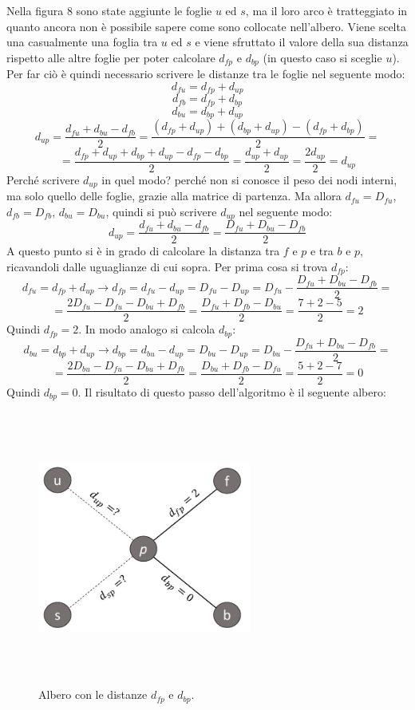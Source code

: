 \newline
Nella figura 8 sono state aggiunte le foglie $u$ ed $s$, ma il loro arco è tratteggiato in quanto ancora non è possibile sapere come sono collocate nell'albero.
\newline
Viene scelta una casualmente una foglia tra $u$ ed $s$ e viene sfruttato il valore della sua distanza rispetto alle altre foglie per poter calcolare $d_{fp}$ e $d_{bp}$ (in questo caso si sceglie $u$). Per far ciò è quindi necessario scrivere le distanze tra le foglie nel seguente modo:
\[d_{fu}=d_{fp}+d_{up}\]
\[d_{fb}=d_{fp}+d_{bp}\]
\[d_{bu}=d_{bp}+d_{up}\]
\[d_{up}=\frac{d_{fu}+d_{bu}-d_{fb}}2=
\frac{(d_{fp}+d_{up})+(d_{bp}+d_{up})-(d_{fp}+d_{bp})}2=\]
\[=\frac{d_{fp}+d_{up}+d_{bp}+d_{up}-d_{fp}-d_{bp}}2=
\frac{d_{up}+d_{up}}2=
\frac{2d_{up}}2=d_{up}
\]
Perché scrivere $d_{up}$ in quel modo? perché non si conosce il peso dei nodi interni, ma solo quello delle foglie, grazie alla matrice di partenza. Ma allora $d_{fu}=D_{fu}$, $d_{fb}=D_{fb}$, $d_{bu}=D_{bu}$, quindi si può scrivere $d_{up}$ nel seguente modo:
\[d_{up}=\frac{d_{fu}+d_{bu}-d_{fb}}2=\frac{D_{fu}+D_{bu}-D_{fb}}2\]
A questo punto si è in grado di calcolare la distanza tra $f$ e $p$ e tra $b$ e $p$, ricavandoli dalle uguaglianze di cui sopra. Per prima cosa si trova $d_{fp}$:
\[d_{fu}=d_{fp}+d_{up} \rightarrow d_{fp}=d_{fu}-d_{up}=D_{fu}-D_{up}=
D_{fu}-\frac{D_{fu}+D_{bu}-D_{fb}}2=\]
\[=\frac{2D_{fu}-D_{fu}-D_{bu}+D_{fb}}2=\frac{D_{fu}+D_{fb}-D_{bu}}2=
\frac{7+2-5}2=2\]
Quindi $d_{fp}=2$. In modo analogo si calcola $d_{bp}$:
\[d_{bu}=d_{bp}+d_{up} \rightarrow d_{bp}=d_{bu}-d_{up}=D_{bu}-D_{up}=
D_{bu}-\frac{D_{fu}+D_{bu}-D_{fb}}2=\]
\[=\frac{2D_{bu}-D_{fu}-D_{bu}+D_{fb}}2=\frac{D_{bu}+D_{fb}-D_{fu}}2=
\frac{5+2-7}2=0\]
Quindi $d_{bp}=0$. Il risultato di questo passo dell'algoritmo è il seguente albero:
\begin{figure}[h!]
\centering
	\includegraphics[height=9cm, width=7cm, keepaspectratio]{distance_between_f_b_part_3.jpg}
 	\caption{Albero con le distanze $d_{fp}$ e $d_{bp}$.}
  	\label{fig:neighborsleaves_3}
\end{figure}
